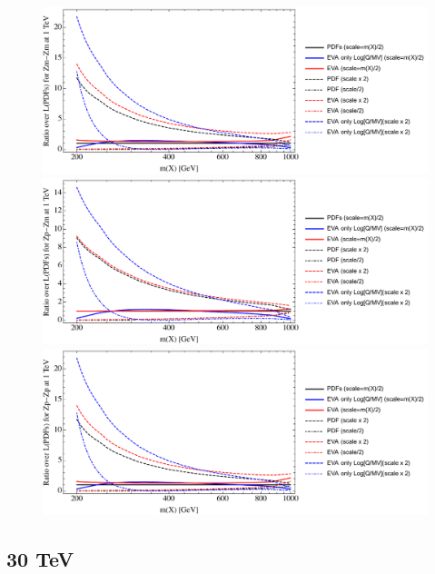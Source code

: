 \documentclass[a4paper,11pt]{article}
\begin{document}
\begin{figure}[ht]
\includegraphics[width=0.4\linewidth]{PlotLumi/1TeV/ratios/Zm-Zm.pdf}
\includegraphics[width=0.4\linewidth]{PlotLumi/1TeV/ratios/Zp-Zm.pdf}
\includegraphics[width=0.4\linewidth]{PlotLumi/1TeV/ratios/Zp-Zp.pdf}
\end{figure}

%
%
%

\clearpage
\subsection{30 TeV}
\end{document}
